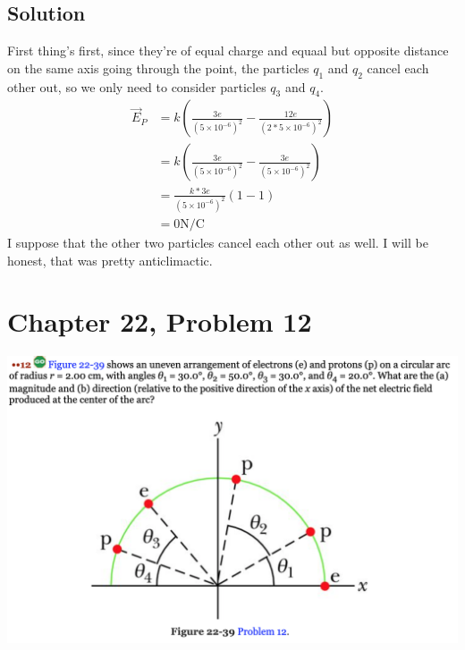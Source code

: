 \documentclass[12pt]{article}
\begin{document}
\subsection*{Solution}
First thing's first, since they're of equal charge and equaal but opposite distance on the same axis going through the point, the particles $q_1$ and $q_2$ cancel each other out, so we only need to consider particles $q_3$ and $q_4$.
\begin{align*}
    \vec{E}_P   &=  k\left(\frac{3e}{(5\times 10^{-6})^2} - \frac{12e}{(2*5\times 10^{-6})^2}\right)\\
        &=  k\left(\frac{3e}{(5\times 10^{-6})^2} - \frac{3e}{(5\times 10^{-6})^2}\right)\\
        &=  \frac{k*3e}{(5\times 10^{-6})^2}\left(1 - 1\right)\\
        &=  \boxed{0\unit{\newton/\coulomb}}
\end{align*}
I suppose that the other two particles cancel each other out as well. I will be honest, that was pretty anticlimactic. 

\pagebreak
\section*{Chapter 22, Problem 12}
\includegraphics[width=\textwidth]{picture_6.png}
\end{document}
